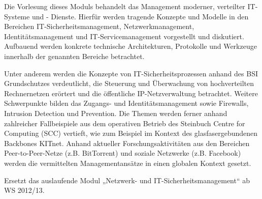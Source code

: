 \begin{module}
\begin{learningoutcomes}
\end{learningoutcomes}

\begin{content}
Die Vorlesung dieses Moduls behandelt das Management moderner, verteilter IT-Systeme und - Dienste. Hierfür werden tragende Konzepte und Modelle in den Bereichen IT-Sicherheitsmanagement, Netzwerkmanagement, Identitätsmanagement und IT-Servicemanagement vorgestellt und diskutiert. Aufbauend werden konkrete technische Architekturen, Protokolle und Werkzeuge innerhalb der genannten Bereiche betrachtet.

 

Unter anderem werden die Konzepte von IT-Sicherheitsprozessen anhand des BSI Grundschutzes verdeutlicht, die Steuerung und Überwachung von hochverteilten Rechnernetzen erörtert und die öffentliche IP-Netzverwaltung betrachtet. Weitere Schwerpunkte bilden das Zugangs- und Identitätsmanagement sowie Firewalls, Intrusion Detection und Prevention. Die Themen werden ferner anhand zahlreicher Fallbeispiele aus dem operativen Betrieb des Steinbuch Centre for Computing (SCC) vertieft, wie zum Beispiel im Kontext des glasfasergebundenen Backbones KITnet. Anhand aktueller Forschungsaktivitäten aus den Bereichen Peer-to-Peer-Netze (z.B. BitTorrent) und soziale Netzwerke (z.B. Facebook) werden die vermittelten Managementansätze in einen globalen Kontext gesetzt.


\end{content}

\begin{remarks}Ersetzt das auslaufende Modul „Netzwerk- und IT-Sicherheitsmanagement“ ab WS 2012/13.

\end{remarks}

\end{module}


